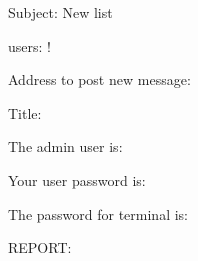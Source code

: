 Subject: New list %

users: !

Address to post new message:

Title:

The admin user is:

Your user password is:

The password for terminal is:

REPORT:

